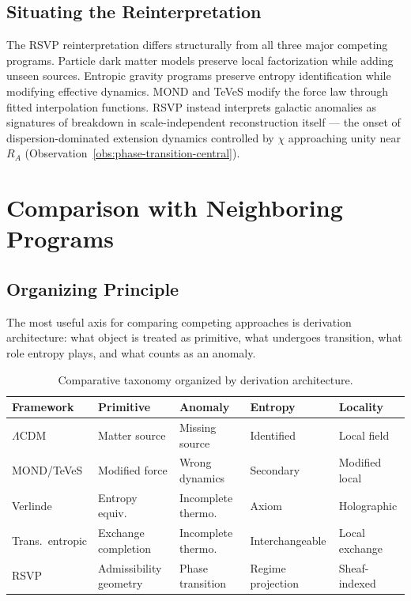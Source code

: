 \documentclass[11pt, a4paper]{article}
\theoremstyle{plain}
\theoremstyle{definition}
\theoremstyle{remark}
\newcommand{\RA}{R_{\!A}}
\begin{document}
\subsection{Situating the Reinterpretation}

The RSVP reinterpretation differs structurally from all three major competing
programs. Particle dark matter models preserve local factorization while adding
unseen sources. Entropic gravity programs \cite{verlinde2017,padmanabhan2010}
preserve entropy identification while modifying effective dynamics. MOND and TeVeS
\cite{milgrom1983,bekenstein2004} modify the force law through fitted interpolation
functions. RSVP instead interprets galactic anomalies as signatures of breakdown in
scale-independent reconstruction itself --- the onset of dispersion-dominated
extension dynamics controlled by $\chi$ approaching unity near $\RA$
(Observation~\ref{obs:phase-transition-central}).

\section{Comparison with Neighboring Programs}
\label{sec:comparison}

\subsection{Organizing Principle}

The most useful axis for comparing competing approaches is derivation architecture:
what object is treated as primitive, what undergoes transition, what role entropy
plays, and what counts as an anomaly.

\begin{table}[ht]
\centering
\renewcommand{\arraystretch}{1.35}
\begin{tabular}{@{}p{3.2cm}p{2.8cm}p{2.8cm}p{2.5cm}p{2.5cm}@{}}
\toprule
\textbf{Framework} & \textbf{Primitive} & \textbf{Anomaly} & \textbf{Entropy} & \textbf{Locality} \\
\midrule
$\Lambda$CDM & Matter source & Missing source & Identified & Local field \\
MOND/TeVeS & Modified force & Wrong dynamics & Secondary & Modified local \\
Verlinde & Entropy equiv.\ & Incomplete thermo.\ & Axiom & Holographic \\
Trans.\ entropic & Exchange completion & Incomplete thermo.\ & Interchangeable & Local exchange \\
RSVP & Admissibility geometry & Phase transition & Regime projection & Sheaf-indexed \\
\bottomrule
\end{tabular}
\caption{Comparative taxonomy organized by derivation architecture.}
\label{tab:comparison}
\end{table}
\end{document}

